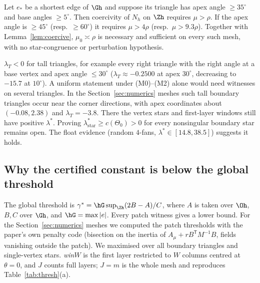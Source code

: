 \begin{corollary}\label{pb:rho}
Let $e_\ast$ be a shortest edge of $\Gh$ and suppose its triangle has apex angle $\ge35^\circ$ and base angles $\ge5^\circ$.
Then coercivity of $N_h$ on $\Zh$ requires $\mu>\rho$. If the apex angle is $\ge45^\circ$ (resp.\ $\ge60^\circ$) it requires
$\mu>4\rho$ (resp.\ $\mu>9.3\rho$). Together with Lemma~\ref{lem:coercive}, $\mu_0\asymp\rho$ is necessary and sufficient on
every such mesh, with no star-congruence or perturbation hypothesis.
\end{corollary}

\begin{remark}\label{pb:limits}
$\lambda_T<0$ for tall triangles, for example every right triangle with the right angle at a base vertex and apex angle
$\le30^\circ$ ($\lambda_T\approx-0.2500$ at apex $30^\circ$, decreasing to $-15.7$ at $10^\circ$). A uniform statement under (M0)--(M2) alone would need witnesses on
several triangles. In the Section~\ref{sec:numerics} meshes such tall boundary triangles occur near the corner directions,
with apex coordinates about $(-0.08,2.38)$ and $\lambda_T=-3.8$. There the vertex stars and first-layer windows still
have positive $\lambda^\ast$. Proving $\lambda^\ast_{\text{star}}\ge c(\Theta_0)>0$ for every nonsingular boundary star remains
open. The float evidence (random $4$-fans, $\lambda^\ast\in[14.8,38.5]$) suggests it holds.
\end{remark}

\subsection{Why the certified constant is below the global threshold}

The global threshold is $\gamma^\ast=\hG\sup_{\Zh}(2B-A)/C$, where $A$ is taken over $\Oh$, $B,C$ over $\Gh$, and
$\hG=\max|e|$. Every patch witness gives a lower bound. For the Section~\ref{sec:numerics} meshes we computed the patch
thresholds with the paper's own penalty code (bisection on the inertia of $A_\mu+rB^{\mathsf T}M^{-1}B$, fields vanishing
outside the patch). We maximised over all boundary triangles and single-vertex stars. \emph{win}$W$ is the first layer
restricted to $W$ columns centred at $\theta=0$, and $J$ counts full layers; $J=m$ is the whole mesh and reproduces
Table~\ref{tab:thresh}(a).

